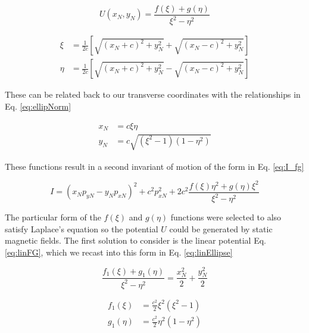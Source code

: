 \begin{equation} \label{eq:darbrouxSol}
	U(x_N,y_N) = \frac{f(\xi) + g(\eta)}{\xi^2 - \eta^2}
\end{equation}

\begin{equation} \label{eq:ellipCoords}
\begin{split}
	\xi &= \frac{1}{2c}\left[ \sqrt{(x_N+c)^2 + y_N^2} + \sqrt{(x_N-c)^2 + y_N^2} \right] \\
	\eta &= \frac{1}{2c}\left[ \sqrt{(x_N+c)^2 + y_N^2} - \sqrt{(x_N-c)^2 + y_N^2} \right]
\end{split}
\end{equation}

These can be related back to our transverse coordinates with the relationships in Eq. \ref{eq:ellipNorm}

\begin{equation} \label{eq:ellipNorm}
\begin{split}
	x_N &= c\xi\eta \\
	y_N &= c \sqrt{(\xi^2-1)(1-\eta^2)}
\end{split}
\end{equation}

These functions result in a second invariant of motion of the form in Eq. \ref{eq:I_fg}

\begin{equation} \label{eq:I_fg}
	I = (x_N p_{yN} - y_N p_{xN})^2 + c^2 p_{xN}^2 + 2c^2 \frac{f(\xi)\eta^2 + g(\eta)\xi^2}{\xi^2 - \eta^2}
\end{equation}

The particular form of the $f(\xi)$ and $g(\eta)$ functions were selected to also satisfy Laplace's equation so the potential $U$ could be generated by static magnetic fields. The first solution to consider is the linear potential Eq. \ref{eq:linFG}, which we recast into this form in Eq. \ref{eq:linEllipse}

\begin{equation} \label{eq:linFG}
	\frac{f_1(\xi) + g_1(\eta)}{\xi^2 - \eta^2} = \frac{x_N^2}{2} + \frac{y_N^2}{2}
\end{equation}

\begin{equation} \label{eq:linEllipse}
\begin{split}
	f_1(\xi) &= \frac{c^2}{2}\xi^2(\xi^2-1)\\
	g_1(\eta) &= \frac{c^2}{2}\eta^2(1 - \eta^2)
\end{split}
\end{equation}

